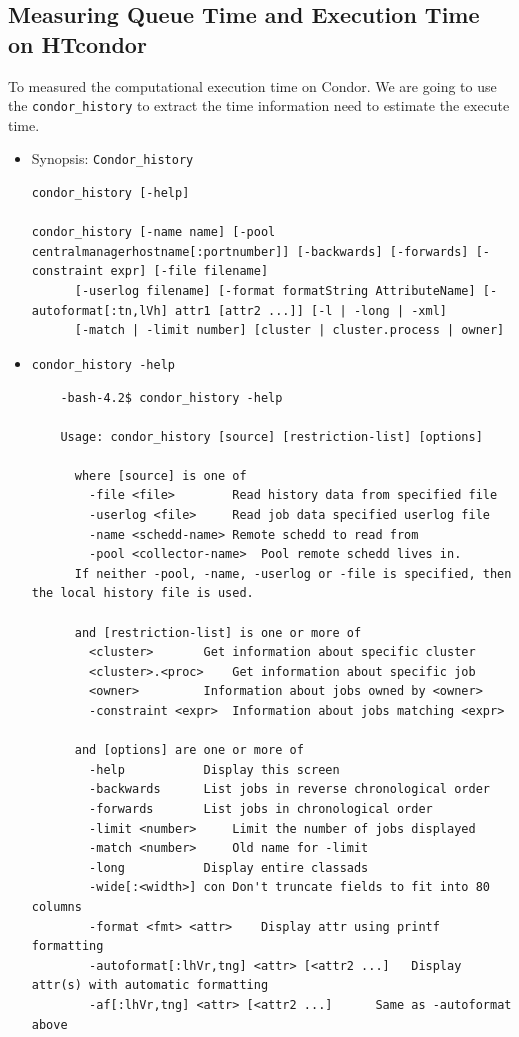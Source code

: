 \documentclass{article}
\begin{document}
\subsection{Measuring Queue Time and Execution Time on HTcondor}
To measured the computational execution time on Condor. We are going to use the \verb+condor_history+ to extract the time information need to estimate the execute time. 
\begin{itemize}
\item Synopsis: \verb+Condor_history+
\scriptsize
\begin{verbatim}
condor_history [-help]

condor_history [-name name] [-pool centralmanagerhostname[:portnumber]] [-backwards] [-forwards] [-constraint expr] [-file filename]
	  [-userlog filename] [-format formatString AttributeName] [-autoformat[:tn,lVh] attr1 [attr2 ...]] [-l | -long | -xml] 
	  [-match | -limit number] [cluster | cluster.process | owner]
\end{verbatim}
\normalsize
\item \verb+condor_history -help+
\scriptsize
\begin{verbatim}
    -bash-4.2$ condor_history -help
    
    Usage: condor_history [source] [restriction-list] [options]

      where [source] is one of
	    -file <file>		Read history data from specified file
	    -userlog <file>		Read job data specified userlog file
	    -name <schedd-name>	Remote schedd to read from
	    -pool <collector-name>	Pool remote schedd lives in.
      If neither -pool, -name, -userlog or -file is specified, then the local history file is used.

      and [restriction-list] is one or more of
	    <cluster>		Get information about specific cluster
	    <cluster>.<proc>	Get information about specific job
	    <owner>			Information about jobs owned by <owner>
	    -constraint <expr>	Information about jobs matching <expr>

      and [options] are one or more of
	    -help			Display this screen
	    -backwards		List jobs in reverse chronological order
	    -forwards		List jobs in chronological order
	    -limit <number>		Limit the number of jobs displayed
	    -match <number>		Old name for -limit
	    -long			Display entire classads
	    -wide[:<width>]	con	Don't truncate fields to fit into 80 columns
	    -format <fmt> <attr>	Display attr using printf formatting
	    -autoformat[:lhVr,tng] <attr> [<attr2 ...]   Display attr(s) with automatic formatting
	    -af[:lhVr,tng] <attr> [<attr2 ...]	    Same as -autoformat above
	    

\end{verbatim}
\end{itemize}
\end{document}

